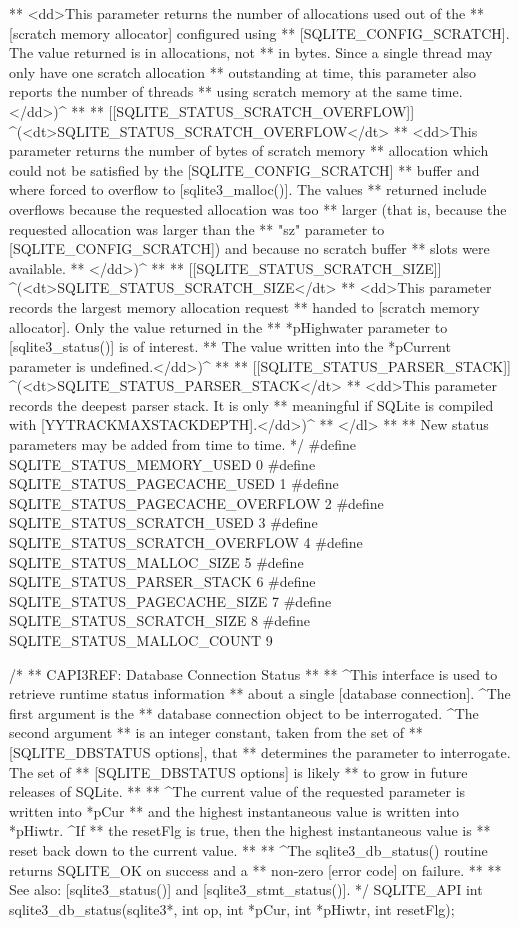 \begin{Codex}[label=sqlite3.h,numbers=left]
{** <dd>This parameter returns the number of allocations used out of the
** [scratch memory allocator] configured using
** [SQLITE_CONFIG_SCRATCH].  The value returned is in allocations, not
** in bytes.  Since a single thread may only have one scratch allocation
** outstanding at time, this parameter also reports the number of threads
** using scratch memory at the same time.</dd>)^
**
** [[SQLITE_STATUS_SCRATCH_OVERFLOW]] ^(<dt>SQLITE_STATUS_SCRATCH_OVERFLOW</dt>
** <dd>This parameter returns the number of bytes of scratch memory
** allocation which could not be satisfied by the [SQLITE_CONFIG_SCRATCH]
** buffer and where forced to overflow to [sqlite3_malloc()].  The values
** returned include overflows because the requested allocation was too
** larger (that is, because the requested allocation was larger than the
** "sz" parameter to [SQLITE_CONFIG_SCRATCH]) and because no scratch buffer
** slots were available.
** </dd>)^
**
** [[SQLITE_STATUS_SCRATCH_SIZE]] ^(<dt>SQLITE_STATUS_SCRATCH_SIZE</dt>
** <dd>This parameter records the largest memory allocation request
** handed to [scratch memory allocator].  Only the value returned in the
** *pHighwater parameter to [sqlite3_status()] is of interest.  
** The value written into the *pCurrent parameter is undefined.</dd>)^
**
** [[SQLITE_STATUS_PARSER_STACK]] ^(<dt>SQLITE_STATUS_PARSER_STACK</dt>
** <dd>This parameter records the deepest parser stack.  It is only
** meaningful if SQLite is compiled with [YYTRACKMAXSTACKDEPTH].</dd>)^
** </dl>
**
** New status parameters may be added from time to time.
*/
#define SQLITE_STATUS_MEMORY_USED          0
#define SQLITE_STATUS_PAGECACHE_USED       1
#define SQLITE_STATUS_PAGECACHE_OVERFLOW   2
#define SQLITE_STATUS_SCRATCH_USED         3
#define SQLITE_STATUS_SCRATCH_OVERFLOW     4
#define SQLITE_STATUS_MALLOC_SIZE          5
#define SQLITE_STATUS_PARSER_STACK         6
#define SQLITE_STATUS_PAGECACHE_SIZE       7
#define SQLITE_STATUS_SCRATCH_SIZE         8
#define SQLITE_STATUS_MALLOC_COUNT         9

/*
** CAPI3REF: Database Connection Status
**
** ^This interface is used to retrieve runtime status information 
** about a single [database connection].  ^The first argument is the
** database connection object to be interrogated.  ^The second argument
** is an integer constant, taken from the set of
** [SQLITE_DBSTATUS options], that
** determines the parameter to interrogate.  The set of 
** [SQLITE_DBSTATUS options] is likely
** to grow in future releases of SQLite.
**
** ^The current value of the requested parameter is written into *pCur
** and the highest instantaneous value is written into *pHiwtr.  ^If
** the resetFlg is true, then the highest instantaneous value is
** reset back down to the current value.
**
** ^The sqlite3_db_status() routine returns SQLITE_OK on success and a
** non-zero [error code] on failure.
**
** See also: [sqlite3_status()] and [sqlite3_stmt_status()].
*/
SQLITE_API int sqlite3_db_status(sqlite3*, int op, int *pCur, int *pHiwtr, int resetFlg);

}
\end{Codex}
